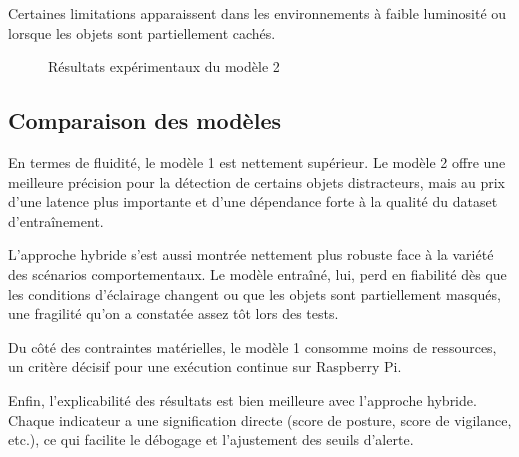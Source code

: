 Certaines limitations apparaissent dans les environnements à faible luminosité ou lorsque les objets sont partiellement cachés.

\begin{figure}[H]
    \centering
    \caption{Résultats expérimentaux du modèle 2}
    \label{fig:results_model2}
\end{figure}

\subsection{Comparaison des modèles}

En termes de fluidité, le modèle 1 est nettement supérieur. Le modèle 2 offre une meilleure précision pour la détection de certains objets distracteurs, mais au prix d’une latence plus importante et d’une dépendance forte à la qualité du dataset d’entraînement.

L’approche hybride s’est aussi montrée nettement plus robuste face à la variété des scénarios comportementaux. Le modèle entraîné, lui, perd en fiabilité dès que les conditions d’éclairage changent ou que les objets sont partiellement masqués, une fragilité qu’on a constatée assez tôt lors des tests.

Du côté des contraintes matérielles, le modèle 1 consomme moins de ressources, un critère décisif pour une exécution continue sur Raspberry Pi.

Enfin, l’explicabilité des résultats est bien meilleure avec l’approche hybride. Chaque indicateur a une signification directe (score de posture, score de vigilance, etc.), ce qui facilite le débogage et l’ajustement des seuils d’alerte.


